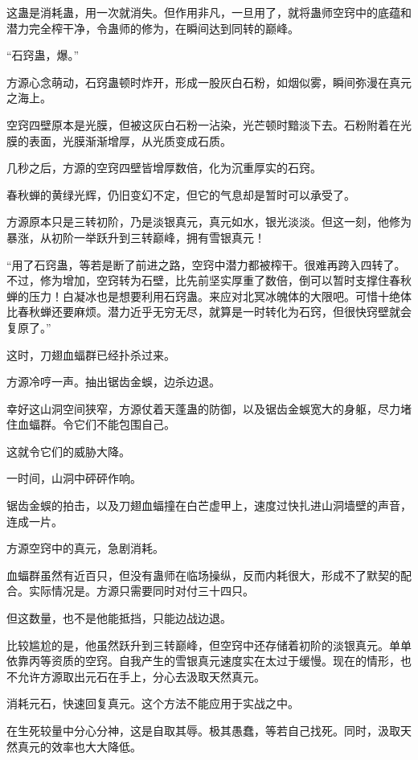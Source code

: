 \begin{this_body}
这蛊是消耗蛊，用一次就消失。但作用非凡，一旦用了，就将蛊师空窍中的底蕴和潜力完全榨干净，令蛊师的修为，在瞬间达到同转的巅峰。

“石窍蛊，爆。”

方源心念萌动，石窍蛊顿时炸开，形成一股灰白石粉，如烟似雾，瞬间弥漫在真元之海上。

空窍四壁原本是光膜，但被这灰白石粉一沾染，光芒顿时黯淡下去。石粉附着在光膜的表面，光膜渐渐增厚，从光质变成石质。

几秒之后，方源的空窍四壁皆增厚数倍，化为沉重厚实的石窍。

春秋蝉的黄绿光辉，仍旧变幻不定，但它的气息却是暂时可以承受了。

方源原本只是三转初阶，乃是淡银真元，真元如水，银光淡淡。但这一刻，他修为暴涨，从初阶一举跃升到三转巅峰，拥有雪银真元！

“用了石窍蛊，等若是断了前进之路，空窍中潜力都被榨干。很难再跨入四转了。不过，修为增加，空窍转为石壁，比先前坚实厚重了数倍，倒可以暂时支撑住春秋蝉的压力！白凝冰也是想要利用石窍蛊。来应对北冥冰魄体的大限吧。可惜十绝体比春秋蝉还要麻烦。潜力近乎无穷无尽，就算是一时转化为石窍，但很快窍壁就会复原了。”

这时，刀翅血蝠群已经扑杀过来。

方源冷哼一声。抽出锯齿金蜈，边杀边退。

幸好这山洞空间狭窄，方源仗着天蓬蛊的防御，以及锯齿金蜈宽大的身躯，尽力堵住血蝠群。令它们不能包围自己。

这就令它们的威胁大降。

一时间，山洞中砰砰作响。

锯齿金蜈的拍击，以及刀翅血蝠撞在白芒虚甲上，速度过快扎进山洞墙壁的声音，连成一片。

方源空窍中的真元，急剧消耗。

血蝠群虽然有近百只，但没有蛊师在临场操纵，反而内耗很大，形成不了默契的配合。实际情况是。方源只需要同时对付三十四只。

但这数量，也不是他能抵挡，只能边战边退。

比较尴尬的是，他虽然跃升到三转巅峰，但空窍中还存储着初阶的淡银真元。单单依靠丙等资质的空窍。自我产生的雪银真元速度实在太过于缓慢。现在的情形，也不允许方源取出元石在手上，分心去汲取天然真元。

消耗元石，快速回复真元。这个方法不能应用于实战之中。

在生死较量中分心分神，这是自取其辱。极其愚蠢，等若自己找死。同时，汲取天然真元的效率也大大降低。


\end{this_body}
